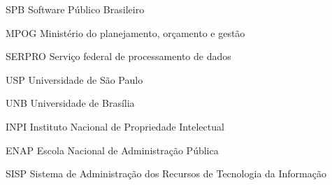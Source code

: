 \begin{siglas}
  \item[SPB] Software Público Brasileiro
  \item[MPOG] Ministério do planejamento, orçamento e gestão
  \item[SERPRO] Serviço federal de processamento de dados
  \item[USP] Universidade de São Paulo
  \item[UNB] Universidade de Brasília
  \item[INPI] Instituto Nacional de Propriedade Intelectual
  \item[ENAP] Escola Nacional de Administração Pública
  \item[SISP] Sistema de Administração dos Recursos de Tecnologia da Informação
\end{siglas}
